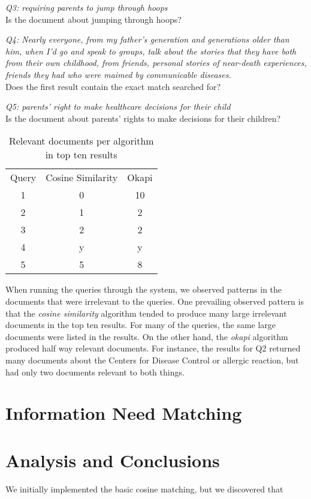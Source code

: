\documentclass{article}
\begin{document}
\noindent
\textit{Q3: requiring parents to jump through hoops}
\\
Is the document about jumping through hoops?

\noindent
\textit{Q4: Nearly everyone, from my father's generation and generations older than him, when I'd go and speak to groups, talk about the stories that they have both from their own childhood, from friends, personal stories of near-death experiences, friends they had who were maimed by communicable diseases.}
\\
Does the first result contain the exact match searched for?

\noindent
\textit{Q5: parents' right to make healthcare decisions for their child}
\\
Is the document about parents' rights to make decisions for their children?

\begin{table}[]
\centering
\begin{tabular}{c | c | c}
Query & Cosine Similarity &  Okapi\\
1 & 0 & 10 \\
2 & 1 & 2 \\
3 & 2 & 2 \\
4 & y & y \\
5 & 5 & 8
\end{tabular}
\caption{Relevant documents per algorithm in top ten results}
\label{tab:my_label}
\end{table}

\hfill

When running the queries through the system, we observed patterns in the documents that were irrelevant to the queries. One prevailing observed pattern is that the \textit{cosine similarity} algorithm tended to produce many large irrelevant documents in the top ten results. For many of the queries, the same large documents were listed in the results. On the other hand, the \textit{okapi} algorithm produced half way relevant documents. For instance, the results for Q2 returned many documents about the Centers for Disease Control or allergic reaction, but had only two documents relevant to both things.

\section{Information Need Matching}

\section{Analysis and Conclusions}
We initially implemented the basic cosine matching, but we discovered that 
\end{document}
